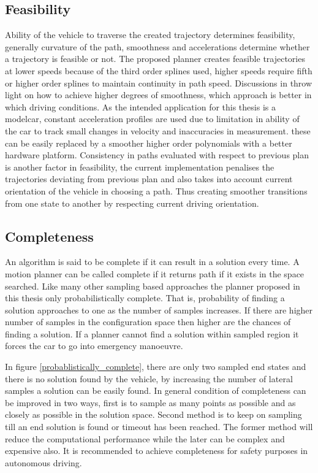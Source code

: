 \subsection{Feasibility}
Ability of the vehicle to traverse the created trajectory determines feasibility, generally curvature of the path, smoothness and accelerations determine whether a trajectory is feasible or not. The proposed planner creates feasible trajectories at lower speeds because of the third order splines used, higher speeds require fifth or higher order splines to maintain continuity in path speed. Discussions in \cite{cmu_parallel_thesis} \cite{ppt_teqniqs_coll_Avdnce} throw light on how to achieve higher degrees of smoothness, which approach is better in which driving conditions. As the intended application for this thesis is a modelcar, constant acceleration profiles are used due to limitation in ability of the car to track small changes in velocity and inaccuracies in measurement. these can be easily replaced by a smoother higher order polynomials with a better hardware platform. Consistency in paths evaluated with respect to previous plan is another factor in feasibility, the current implementation penalises the trajectories deviating from previous plan and also takes into account current orientation of the vehicle in choosing a path. Thus creating smoother transitions from one state to another by respecting current driving orientation. 

\subsection{Completeness}
\label{completeness}
An algorithm is said to be complete if it can result in a solution every time. A motion planner can be called complete if it returns path if it exists in the space searched. Like many other sampling based approaches the planner proposed in this thesis only probabilistically complete. That is, probability of finding a solution approaches to one as the number of samples increases. If there are higher number of samples in the configuration space then higher are the chances of finding a solution. If a planner cannot find a solution within sampled region it forces the car to go into emergency manoeuvre. 

In figure \ref{probablistically_complete}, there are only two sampled end states and there is no solution found by the vehicle, by increasing the number of lateral samples a solution can be easily found. In general condition of completeness can be improved in two ways, first is to sample as many points as possible and as closely as possible in the solution space. Second method is to keep on sampling till an end solution is found or timeout has been reached. The former method will reduce the computational performance while the later can be complex and expensive also. It is recommended to achieve completeness for safety purposes in autonomous driving. 

